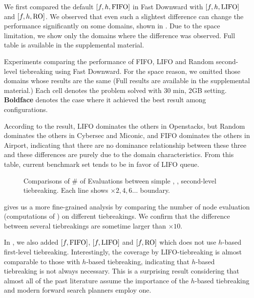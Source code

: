 We first compared the default $[f,h,\mbox{FIFO}]$ in Fast Downward with
$[f,h,\mbox{LIFO}]$ and $[f,h,\mbox{RO}]$.  We observed that even such a slightest
difference can change the performance significantly on some domains,
shown in . Due to the space limitation, we show
only the domains where the difference was observed. Full table is
available in the supplemental material.

\begin{table}[htbp]
 \centering {} 
  \caption{Experiments
 comparing the performance of FIFO, LIFO and Random second-level
 tiebreaking using Fast Downward. For the space reason, we omitted those
 domains whose results are the same (Full results are available in the
 supplemental material.) Each cell denotes the problem solved with 30
 min, 2GB setting. \textbf{Boldface} denotes the case where it achieved
 the best result among configurations.}  \label{single-coverage}
\end{table}

According to the result, LIFO dominates the others in Openstacks, but
Random dominates the others in Cybersec and Miconic, and FIFO dominates
the others in Airport, indicating that there are no dominance
relationship between these three and these differences are purely due to
the domain characteristics.  From this table, current benchmark set
tends to be in favor of LIFO queue.

\begin{figure}[htbp]
 \centering {}
 
 \caption{Comparisons of \# of Evaluations between simple \lifo, \fifo,
 \ro second-level tiebreaking. Each line shows $\times 2,4,6\ldots$ boundary.}
 \label{f-h-eval}
\end{figure}

 gives us a more fine-grained analysis by comparing the
number of node evaluation (computations of \lmcut) on
different tiebreakings. We confirm that the difference between several
tiebreakings are sometime larger than $\times 10$.

In , we also added $[f,\mbox{FIFO}]$, $[f,\mbox{LIFO}]$ and
$[f,\mbox{RO}]$ which does not use $h$-based first-level tiebreaking.
Interestingly, the coverage by LIFO-tiebreaking is almost comparable to
those with $h$-based tiebreaking, indicating that $h$-based tiebreaking
is not always necessary.  This is a surprising result considering
that almost all of the past literature assume the importance of the
$h$-based tiebreaking and modern forward search planners employ one.

